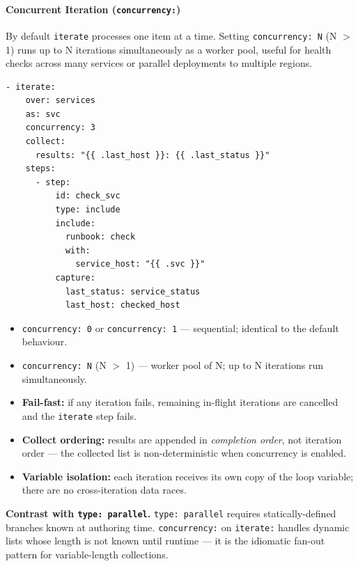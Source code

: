\paragraph{Concurrent Iteration (\texttt{concurrency:})}
\label{para:iterate-concurrency}

By default \texttt{iterate} processes one item at a time.  Setting
\texttt{concurrency: N} (N $>$ 1) runs up to N iterations simultaneously as a
worker pool, useful for health checks across many services or parallel
deployments to multiple regions.

\begin{verbatim}
- iterate:
    over: services
    as: svc
    concurrency: 3
    collect:
      results: "{{ .last_host }}: {{ .last_status }}"
    steps:
      - step:
          id: check_svc
          type: include
          include:
            runbook: check
            with:
              service_host: "{{ .svc }}"
          capture:
            last_status: service_status
            last_host: checked_host
\end{verbatim}

\begin{itemize}
  \item \texttt{concurrency: 0} or \texttt{concurrency: 1} — sequential;
        identical to the default behaviour.
  \item \texttt{concurrency: N} (N $>$ 1) — worker pool of N; up to N
        iterations run simultaneously.
  \item \textbf{Fail-fast:} if any iteration fails, remaining in-flight
        iterations are cancelled and the \texttt{iterate} step fails.
  \item \textbf{Collect ordering:} results are appended in \emph{completion
        order}, not iteration order — the collected list is non-deterministic
        when concurrency is enabled.
  \item \textbf{Variable isolation:} each iteration receives its own copy of
        the loop variable; there are no cross-iteration data races.
\end{itemize}

\noindent\textbf{Contrast with \texttt{type: parallel}.}
\texttt{type: parallel} requires statically-defined branches known at
authoring time.  \texttt{concurrency:} on \texttt{iterate:} handles dynamic
lists whose length is not known until runtime — it is the idiomatic fan-out
pattern for variable-length collections.

